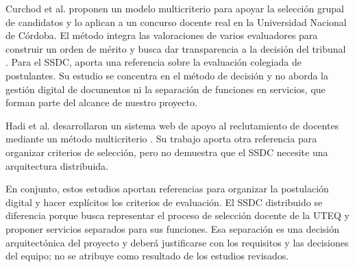 Curchod et al. proponen un modelo multicriterio para apoyar la selección grupal de candidatos y lo aplican a un concurso docente real en la Universidad Nacional de Córdoba. El método integra las valoraciones de varios evaluadores para construir un orden de mérito y busca dar transparencia a la decisión del tribunal \cite{curchod2022multicriteria}. Para el SSDC, aporta una referencia sobre la evaluación colegiada de postulantes. Su estudio se concentra en el método de decisión y no aborda la gestión digital de documentos ni la separación de funciones en servicios, que forman parte del alcance de nuestro proyecto.

Hadi et al. desarrollaron un sistema web de apoyo al reclutamiento de docentes mediante un método multicriterio \cite{hadi2024mcdm}. Su trabajo aporta otra referencia para organizar criterios de selección, pero no demuestra que el SSDC necesite una arquitectura distribuida.

En conjunto, estos estudios aportan referencias para organizar la postulación digital y hacer explícitos los criterios de evaluación. El SSDC distribuido se diferencia porque busca representar el proceso de selección docente de la UTEQ y proponer servicios separados para sus funciones. Esa separación es una decisión arquitectónica del proyecto y deberá justificarse con los requisitos y las decisiones del equipo; no se atribuye como resultado de los estudios revisados.